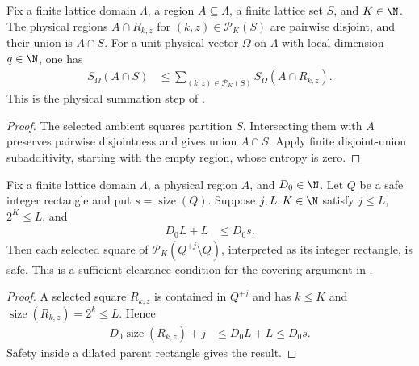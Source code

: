 \begin{lemma}
    \label{thm:area_template_physical_dyadic_entropy}
    \leanok
    Fix a finite lattice domain $\Lambda$, a region $A\subseteq\Lambda$,
    a finite lattice set $S$, and $K\in\N$. The physical regions
    $A\cap R_{k,z}$ for $(k,z)\in\mathcal P_K(S)$ are pairwise disjoint,
    and their union is $A\cap S$. For a unit physical vector $\Omega$
    on $\Lambda$ with local dimension $q\in\N$, one has
    \begin{align}
        S_\Omega(A\cap S)
         & \le\sum_{(k,z)\in\mathcal P_K(S)}S_\Omega(A\cap R_{k,z}).
    \end{align}
    This is the physical summation step of
    \cite[Lemma~9.4, lines~651--664]{OpenAI2026AreaLaw}.
\end{lemma}
\begin{proof}
    \leanok
    The selected ambient squares partition $S$. Intersecting them with
    $A$ preserves pairwise disjointness and gives union $A\cap S$.
    Apply finite disjoint-union subadditivity, starting with the empty
    region, whose entropy is zero.
\end{proof}

\begin{lemma}
    \label{thm:area_law_rectangle_shell_safe_cells}
    \leanok
    Fix a finite lattice domain $\Lambda$, a physical region $A$, and
    $D_0\in\N$. Let $Q$ be a safe integer rectangle and put
    $s=\operatorname{size}(Q)$. Suppose $j,L,K\in\N$ satisfy
    $j\le L$, $2^K\le L$, and
    \begin{align}
        D_0L+L & \le D_0s.
    \end{align}
    Then each selected square of $\mathcal P_K(Q^{+j}\setminus Q)$,
    interpreted as its integer rectangle, is safe.
    This is a sufficient clearance condition for the covering argument in
    \cite[proof of Proposition~9.5, lines~723--729]{OpenAI2026AreaLaw}.
\end{lemma}
\begin{proof}
    \leanok
    A selected square $R_{k,z}$ is contained in $Q^{+j}$ and has
    $k\le K$ and $\operatorname{size}(R_{k,z})=2^k\le L$. Hence
    \begin{align}
        D_0\operatorname{size}(R_{k,z})+j
         & \le D_0L+L\le D_0s.
    \end{align}
    Safety inside a dilated parent rectangle gives the result.
\end{proof}

